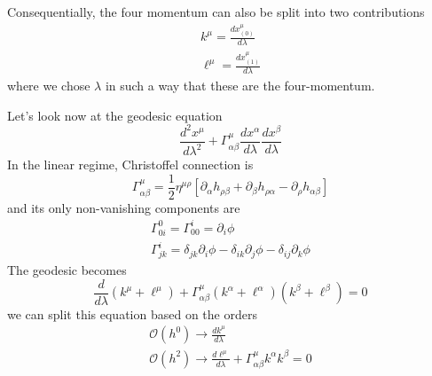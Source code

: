 Consequentially, the four momentum can also be split into two contributions
\begin{gather*}
k^{\mu } = \frac{d x^{\mu }_{\left( 0 \right)}}{d \lambda } \\
\ell^{\mu } = \frac{d x^{\mu }_{\left( 1 \right)}}{d \lambda }
\end{gather*}
where we chose $\lambda $ in such a way that these are the four-momentum.\par
Let's look now at the geodesic equation
\[
\frac{d ^{2}x^{\mu }}{d \lambda ^{2} } + \Gamma ^{\mu }_{\alpha \beta } \frac{d x^{\alpha }}{d \lambda }\frac{d x^{\beta }}{d \lambda }
\]
In the linear regime, Christoffel connection is
\[
\Gamma ^{\mu }_{\alpha \beta } = \frac{1}{2}\eta ^{\mu \rho }\left[ \partial_{\alpha }h_{\rho \beta }+ \partial_{\beta }h_{\rho \alpha } - \partial_{\rho }h_{\alpha \beta } \right]
\]
and its only non-vanishing components are
\begin{gather*}
\Gamma ^{0}_{0i} = \Gamma ^{i}_{00} = \partial_{i}\phi  \\
\Gamma ^{i}_{jk} = \delta _{jk}\partial_{i}\phi - \delta _{ik}\partial_{j} \phi - \delta _{ij}\partial_{k}\phi  
\end{gather*}
The geodesic becomes
\begin{equation}
\frac{d }{d \lambda }\left( k^{\mu }+ \ell^{\mu } \right) + \Gamma ^{\mu }_{\alpha \beta }\left( k^{\alpha }+ \ell^{\alpha } \right)\left( k^{\beta }+\ell^{\beta } \right) = 0
\end{equation}
we can split this equation based on the orders
\begin{gather*}
\mathcal{O} \left( h^{0} \right)  \to  \frac{d k^{\mu }}{d \lambda }\\
\mathcal{O} \left( h^{2} \right) \to \frac{d \ell^{\mu }}{d \lambda } + \Gamma ^{\mu }_{\alpha \beta }k^{\alpha }k^{\beta } = 0
\end{gather*}

